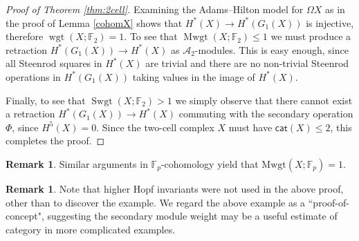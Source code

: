\documentclass{amsart}
\theoremstyle{plain}
\theoremstyle{definition}
\newtheorem{rem}[thm]{Remark}
\def\cat{\mathsf{cat}}
\newcommand{\F}{\mathbb{F}}
\def\Mwgt{\mathrm{Mwgt}}
\begin{document}
\begin{proof}[Proof of Theorem \ref{thm:2cell}]
Examining the Adams--Hilton model for $\Omega X$ as in the proof of Lemma \ref{cohomX} shows that $H^*(X)\to H^*(G_1(X))$ is injective, therefore $\operatorname{wgt}(X;\F_2)=1$. To see that $\operatorname{Mwgt}(X;\F_2)\leq 1$ we must produce a retraction $H^*(G_1(X))\to H^*(X)$ as $\mathcal{A}_2$-modules. This is easy enough, since all Steenrod squares in $H^*(X)$ are trivial and there are no non-trivial Steenrod operations in $H^*(G_1(X))$ taking values in the image of $H^*(X)$. 

Finally, to see that $\operatorname{Swgt}(X;\F_2)>1$ we simply observe that there cannot exist a retraction $H^*(G_1(X))\to H^*(X)$ commuting with the secondary operation $\Phi$, since $H^5(X)=0$. Since the two-cell complex $X$ must have $\cat(X)\le 2$, this completes the proof. 
\end{proof}

\begin{rem}
Similar arguments in $\F_p$-cohomology yield that $\Mwgt(X;\F_p)=1$.
\end{rem}

\begin{rem}
Note that higher Hopf invariants were not used in the above proof, other than to discover the example. We regard the above example as a ``proof-of-concept", suggesting the secondary module weight may be a useful estimate of category in more complicated examples.
\end{rem}
\end{document}
